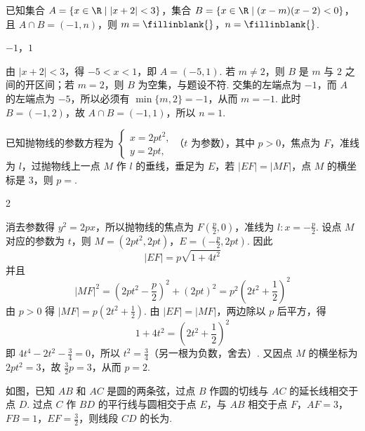 \begin{problem}
已知集合 \(A = \{x \in \R \mid |x + 2| < 3\}\)，集合 \(B = \{x \in \R \mid (x - m)(x - 2) < 0\}\)，且 \(A \cap B = (-1, n)\)，则 \(m =\fillinblank{}\)，\(n =\fillinblank{}\).
\end{problem}

\begin{answer}
\(-1\)，\(1\)
\end{answer}

\begin{solution}
由 \(|x+2|<3\)，得 \(-5<x<1\)，即 \(A=(-5,1)\). 若 \(m\neq2\)，则 \(B\) 是 \(m\) 与 \(2\) 之间的开区间；若 \(m=2\)，则 \(B\) 为空集，与题设不符. 交集的左端点为 \(-1\)，而 \(A\) 的左端点为 \(-5\)，所以必须有 \(\min\{m,2\}=-1\)，从而 \(m=-1\). 此时 \(B=(-1,2)\)，故 \(A\cap B=(-1,1)\)，所以 \(n=1\).
\end{solution}

\begin{problem}
已知抛物线的参数方程为 \(\begin{cases}
x = 2pt^2,\\
y = 2pt,
\end{cases}\)（\(t\) 为参数），其中 \(p > 0\)，焦点为 \(F\)，准线为 \(l\)，过抛物线上一点 \(M\) 作 \(l\) 的垂线，垂足为 \(E\)，若 \(|EF| = |MF|\)，点 \(M\) 的横坐标是 3，则 \(p = \)\fillinblank{}.
\end{problem}

\begin{answer}
2
\end{answer}

\begin{solution}
消去参数得 \(y^2=2px\)，所以抛物线的焦点为 \(F\left(\frac p2,0\right)\)，准线为 \(l:x=-\frac p2\). 设点 \(M\) 对应的参数为 \(t\)，则 \(M=(2pt^2,2pt)\)，\(E=\left(-\frac p2,2pt\right)\).
因此
\[
|EF|=p\sqrt{1+4t^2}
\]
并且
\[
|MF|^2=\left(2pt^2-\frac p2\right)^2+(2pt)^2=p^2\left(2t^2+\frac12\right)^2
\]
由 \(p>0\) 得 \(|MF|=p\left(2t^2+\frac12\right)\). 由 \(|EF|=|MF|\)，两边除以 \(p\) 后平方，得
\[
1+4t^2=\left(2t^2+\frac12\right)^2
\]
即 \(4t^4-2t^2-\frac34=0\)，所以 \(t^2=\frac34\)（另一根为负数，舍去）. 又因点 \(M\) 的横坐标为 \(2pt^2=3\)，故 \(\frac32p=3\)，从而 \(p=2\).
\end{solution}

\begin{problem}
如图，已知 \(AB\) 和 \(AC\) 是圆的两条弦，过点 \(B\) 作圆的切线与 \(AC\) 的延长线相交于点 \(D\). 过点 \(C\) 作 \(BD\) 的平行线与圆相交于点 \(E\)，与 \(AB\) 相交于点 \(F\)，\(AF = 3\)，\(FB = 1\)，\(EF = \frac{3}{2}\)，则线段 \(CD\) 的长为\fillinblank{}.

\end{problem}

